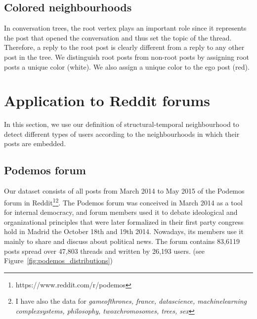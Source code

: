 \documentclass[9pt,technote]{IEEEtran}
\begin{document}
\subsection{Colored neighbourhoods}
In conversation trees, the root vertex plays an important role since it represents the post that opened the conversation and thus set the topic of the thread. Therefore, a reply to the root post is clearly different from a reply to any other post in the tree. We distinguish root posts from non-root posts by assigning root posts a unique color (white). We also assign a unique color to the ego post (red). 


\section{Application to Reddit forums}
In this section, we use our definition of structural-temporal neighbourhood to detect different types of users according to the neighbourhoods in which their posts are embedded.

\subsection{Podemos forum}
Our dataset consists of all posts from March 2014 to May 2015 of the Podemos forum in Reddit\footnote{https://www.reddit.com/r/podemos}\footnote{I have also the data for \textit{gameofthrones, france, datascience, machinelearning complexsystems, philosophy, twoxchromosomes, trees, sex}}. The Podemos forum was conceived in March 2014 as a tool for internal democracy, and forum members used it to debate ideological and organizational principles that were later formalized in their first party congress hold in Madrid the October 18th and 19th 2014. Nowadays, its members use it mainly to share and discuss about political news.
The forum contains 83,6119 posts spread over 47,803 threads and written by 26,193 users. (see Figure~\ref{fig:podemos_distributions})
\end{document}
